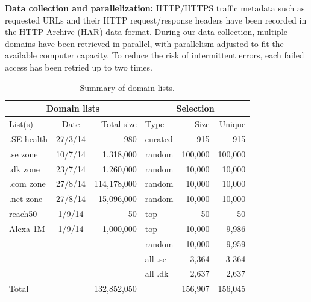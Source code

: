 \documentclass[letterpaper]{sig-alternate-10pt}
\begin{document}
{\bf Data collection and parallelization:}
HTTP/HTTPS traffic metadata such
as requested URLs and their HTTP request/response headers have been recorded in the HTTP
Archive (HAR) data format.
During our data collection,
multiple domains have been retrieved in parallel, 
with parallelism adjusted to fit the available computer capacity. 
To reduce the risk of intermittent errors,
each failed access has been retried up to two times.

\begin{table}[t]
\centering
\caption{Summary of domain lists.}
\label{tab:domains}
{\small
\begin{tabular}{|l|c|r|l|r|r|}
\hline
\multicolumn{3}{|c}{Domain lists} & \multicolumn{3}{|c|}{Selection} \\\hline
List(s)           & Date       & Total size  & Type      & Size & Unique\\\hline
.SE health        & 27/3/14    & 980         & curated   & 915            & 915   \\\hline
.se zone          & 10/7/14    & 1,318,000   & random    & 100,000        & 100,000 \\\hline
.dk zone          & 23/7/14    & 1,260,000   & random    & 10,000         & 10,000 \\\hline
.com zone         & 27/8/14    & 114,178,000 & random    & 10,000         & 10,000 \\\hline
.net zone         & 27/8/14    & 15,096,000  & random    & 10,000         & 10,000 \\\hline
reach50           & 1/9/14     & 50          & top       & 50             & 50 \\\hline
Alexa 1M          & 1/9/14     & 1,000,000   & top       & 10,000         & 9,986 \\\hline
                  &            &             & random    & 10,000         & 9,959 \\\hline
                  &            &             & all .se   & 3,364          & 3 364 \\\hline
                  &            &             & all .dk   & 2,637          & 2,637 \\\hline
Total             &            & 132,852,050 &           & 156,907        & 156,045 \\\hline
\end{tabular}}
\vspace{-16pt}
\end{table}
\end{document}
